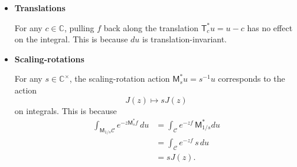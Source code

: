 \documentclass{article}
\newcommand{\C}{\mathbb{C}}
\theoremstyle{definition}
\theoremstyle{plain}
\begin{document}
\begin{itemize}
\item[] \textbf{Translations}

For any $c \in \C$, pulling $f$ back along the translation $\mathsf{T}_c^* u = u - c$ has no effect on the integral. This is because $du$ is translation-invariant.

\item[] \textbf{Scaling-rotations}

For any $s \in \C^\times$, the scaling-rotation action $\mathsf{M}_s^* u = s^{-1} u$ corresponds to the action
\[ J(z) \mapsto s J(z) \]
on integrals. This is because
\begin{align*}
\int_{\mathsf{M}_{1/s} \mathcal{C}} e^{-z \mathsf{M}_s^* f}\,du & = \int_\mathcal{C} e^{-zf}\,\mathsf{M}_{1/s}^* du \\
& = \int_\mathcal{C} e^{-zf}\,s\,du \\
& = s J(z).
\end{align*}
\end{itemize}
\end{document}

